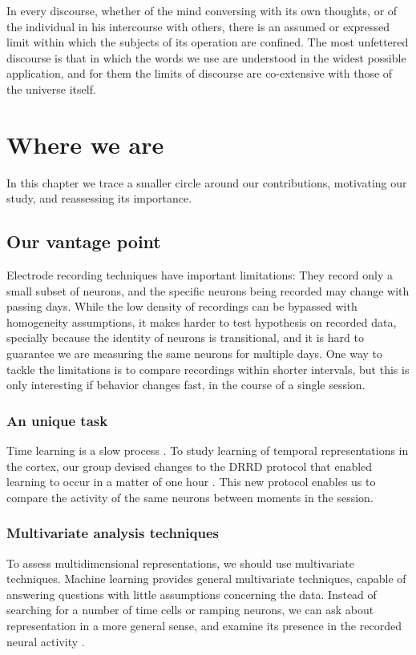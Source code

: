 \begin{savequote}[75mm]
In every discourse, whether of the mind conversing with its own thoughts, or of the individual in his intercourse with others, there is an assumed or expressed limit within which the subjects of its operation are confined. The most unfettered discourse is that in which the words we use are understood in the widest possible application, and for them the limits of discourse are co-extensive with those of the universe itself.
\end{savequote}

\chapter{Where we are}
\label{chap:where}

In this chapter we trace a smaller circle around our contributions, motivating our study, and reassessing its importance.

\section{Our vantage point}
Electrode recording techniques have important limitations: They record only a small subset of neurons, and the specific neurons being recorded may change with passing days. While the low density of recordings can be bypassed with homogeneity assumptions, it makes harder to test hypothesis on recorded data, specially because the identity of neurons is transitional, and it is hard to guarantee we are measuring the same neurons for multiple days. One way to tackle the limitations is to compare recordings within shorter intervals, but this is only interesting if behavior changes fast, in the course of a single session. 

    \subsection{An unique task}
        Time learning is a slow process \cite{paton2018neural}. To study learning of temporal representations in the cortex, our group devised changes to the DRRD protocol that enabled learning to occur in a matter of one hour \cite{ReyesDRRD}. This new protocol enables us to compare the activity of the same neurons between moments in the session. 

    \subsection{Multivariate analysis techniques}
        To assess multidimensional representations, we should use multivariate techniques. Machine learning provides general multivariate techniques, capable of answering questions with little assumptions concerning the data. Instead of searching for a number of time cells or ramping neurons, we can ask about representation in a more general sense, and examine its presence in the recorded neural activity \cite{bakhurin2017differential}. 

